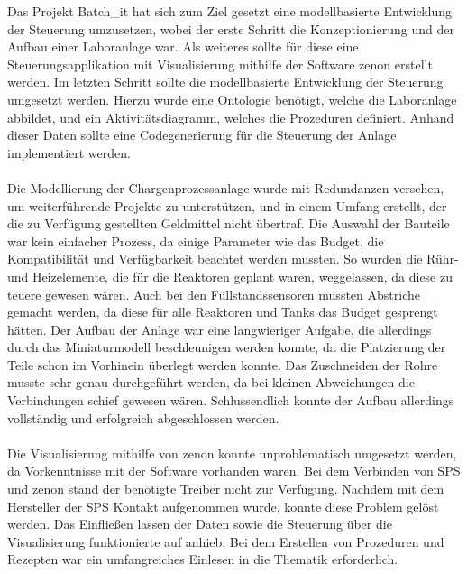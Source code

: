 Das Projekt Batch\_it hat sich zum Ziel gesetzt eine modellbasierte Entwicklung der Steuerung umzusetzen, wobei der erste Schritt die Konzeptionierung und der Aufbau einer Laboranlage war. Als weiteres sollte für diese eine Steuerungsapplikation mit Visualisierung mithilfe der Software zenon erstellt werden. Im letzten Schritt sollte die modellbasierte Entwicklung der Steuerung umgesetzt werden. Hierzu wurde eine Ontologie benötigt, welche die Laboranlage abbildet, und ein Aktivitätsdiagramm, welches die Prozeduren definiert. Anhand dieser Daten sollte eine Codegenerierung für die Steuerung der Anlage implementiert werden. \\\\
Die Modellierung der Chargenprozessanlage wurde mit Redundanzen versehen, um weiterführende Projekte zu unterstützen, und in einem Umfang erstellt, der die zu Verfügung gestellten Geldmittel nicht übertraf. 
Die Auswahl der Bauteile war kein einfacher Prozess, da einige Parameter wie das Budget, die Kompatibilität und Verfügbarkeit beachtet werden mussten. So wurden die Rühr- und Heizelemente, die für die Reaktoren geplant waren, weggelassen, da diese zu teuere gewesen wären. Auch bei den Füllstandssensoren mussten Abstriche gemacht werden, da diese für alle Reaktoren und Tanks das Budget gesprengt hätten.
Der Aufbau der Anlage war eine langwieriger Aufgabe, die allerdings durch das Miniaturmodell beschleunigen werden konnte, da die Platzierung der Teile schon im Vorhinein überlegt werden konnte. Das Zuschneiden der Rohre musste sehr genau durchgeführt werden, da bei kleinen Abweichungen die Verbindungen schief gewesen wären. Schlussendlich konnte der Aufbau allerdings vollständig und erfolgreich abgeschlossen werden. \\\\
Die Visualisierung mithilfe von zenon konnte unproblematisch umgesetzt werden, da Vorkenntnisse mit der Software vorhanden waren. Bei dem Verbinden von SPS und zenon stand der benötigte Treiber nicht zur Verfügung. Nachdem mit dem Hersteller der SPS Kontakt aufgenommen wurde, konnte diese Problem gelöst werden. Das Einfließen lassen der Daten sowie die Steuerung über die Visualisierung funktionierte auf anhieb. Bei dem Erstellen von Prozeduren und Rezepten war ein umfangreiches Einlesen in die Thematik erforderlich.\\\\
